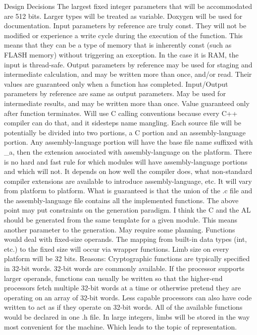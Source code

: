 Design Decisions
The largest fixed integer parameters that will be accommodated are 512 bits. Larger types will be treated as variable.
Doxygen will be used for documentation.
Input parameters by reference are truly const. They will not be modified or experience a write cycle during the execution of the function. This means that they can be a type of memory that is inherently const (such as FLASH memory) without triggering an exception. In the case it is RAM, the input is thread-safe.
Output parameters by reference may be used for staging and intermediate calculation, and may be written more than once, and/or read. Their values are guaranteed only when a function has completed.
Input/Output parameters by reference are same as output parameters. May be used for intermediate results, and may be written more than once. Value guaranteed only after function terminates.
Will use C calling conventions because every C++ compiler can do that, and it sidesteps name mangling.
Each source file will be potentially be divided into two portions, a C portion and an assembly-language portion. Any assembly-language portion will have the base file name suffixed with \_a, then the extension associated with assembly-language on the platform. There is no hard and fast rule for which modules will have assembly-language portions and which will not. It depends on how well the compiler does, what non-standard compiler extensions are available to introduce assembly-language, etc. It will vary from platform to platform. What is guaranteed is that the union of the .c file and the assembly-language file contains all the implemented functions.
The above point may put constraints on the generation paradigm. I think the C and the AL should be generated from the same template for a given module. This means another parameter to the generation. May require some planning.
Functions would deal with fixed-size operands. The mapping from built-in data types (int, etc.) to the fixed size will occur via wrapper functions.
Limb size on every platform will be 32 bits. Reasons:
Cryptographic functions are typically specified in 32-bit words.
32-bit words are commonly available.
If the processor supports larger operands, functions can usually be written so that the higher-end processors fetch multiple 32-bit words at a time or otherwise pretend they are operating on an array of 32-bit words.
Less capable processors can also have code written to act as if they operate on 32-bit words.
All of the available functions would be declared in one .h file.
In large integers, limbs will be stored in the way most convenient for the machine. Which leads to the topic of representation.
